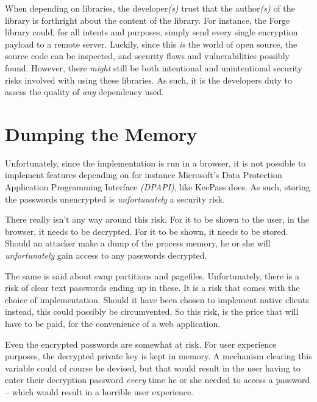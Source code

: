		When depending on libraries, the developer\emph{(s)} trust that the author\emph{(s)} of the library is forthright about the content of the library. For instance, the Forge library could, for all intents and purposes, simply send every single encryption payload to a remote server. Luckily, since this \emph{is} the world of open source, the source code can be inspected, and security flaws and vulnerabilities possibly found. However, there \emph{might} still be both intentional and unintentional security risks involved with using these libraries. As such, it is the developers duty to assess the quality of \emph{any} dependency used.

	\section{Dumping the Memory}
		Unfortunately, since the implementation is run in a browser, it is not possible to implement features depending on for instance Microsoft's Data Protection Application Programming Interface \emph{(DPAPI)}, like KeePass does. As such, storing the passwords unencrypted is \emph{unfortunately} a security risk.

		There really isn't any way around this risk. For it to be shown to the user, in the browser, it needs to be decrypted. For it to be shown, it needs to be stored. Should an attacker make a dump of the process memory, he or she will \emph{unfortunately} gain access to any passwords decrypted. 

		The same is said about swap partitions and pagefiles. Unfortunately, there is a risk of clear text passwords ending up in these. It is a risk that comes with the choice of implementation. Should it have been chosen to implement native clients instead, this could possibly be circumvented. So this risk, is the price that will have to be paid, for the convenience of a web application.

		Even the encrypted passwords are somewhat at risk. For user experience purposes, the decrypted private key is kept in memory. A mechanism clearing this variable could of course be devised, but that would result in the user having to enter their decryption password \emph{every} time he or she needed to access a password -- which would result in a horrible user experience.



